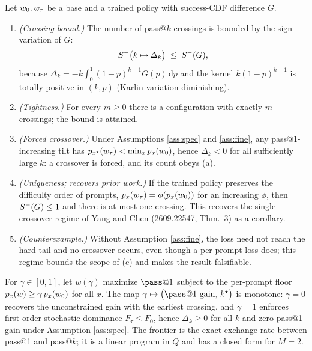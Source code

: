 \begin{theorem}
\label{thm:price}
Let $w_0,w_\tau$ be a base and a trained policy with success-CDF difference $G$.
\begin{enumerate}
\item[(a)] \emph{(Crossing bound.)} The number of pass@$k$ crossings is bounded
by the sign variation of $G$:
\begin{equation}
S^{-}\big(k\mapsto\Delta_k\big)\;\le\;S^{-}(G),
\end{equation}
because $\Delta_k=-k\int_0^1 (1-p)^{k-1}G(p)\,\mathrm{d}p$ and the kernel
$k(1-p)^{k-1}$ is totally positive in $(k,p)$ (Karlin variation diminishing).
\item[(b)] \emph{(Tightness.)} For every $m\ge 0$ there is a configuration with
exactly $m$ crossings; the bound is attained.
\item[(c)] \emph{(Forced crossover.)} Under Assumptions \ref{ass:spec} and
\ref{ass:fine}, any pass@1-increasing tilt has $p_{x^\star}(w_\tau)<\min_x p_x(w_0)$,
hence $\Delta_k<0$ for all sufficiently large $k$: a crossover is forced, and its
count obeys (a).
\item[(d)] \emph{(Uniqueness; recovers prior work.)} If the trained policy
preserves the difficulty order of prompts, $p_x(w_\tau)=\phi(p_x(w_0))$ for an
increasing $\phi$, then $S^{-}(G)\le 1$ and there is at most one crossing. This
recovers the single-crossover regime of Yang and Chen (2609.22547, Thm.~3) as a
corollary.
\item[(e)] \emph{(Counterexample.)} Without Assumption \ref{ass:fine}, the loss
need not reach the hard tail and no crossover occurs, even though a per-prompt
loss does; this regime bounds the scope of (c) and makes the result
falsifiable.
\end{enumerate}
\end{theorem}

\begin{theorem}
\label{thm:frontier}
For $\gamma\in[0,1]$, let $w(\gamma)$ maximize $\pass@1$ subject to the
per-prompt floor $p_x(w)\ge\gamma\,p_x(w_0)$ for all $x$. The map
$\gamma\mapsto\big(\pass@1\text{ gain},\,k^\star\big)$ is monotone: $\gamma=0$
recovers the unconstrained gain with the earliest crossing, and $\gamma=1$
enforces first-order stochastic dominance $F_\tau\le F_0$, hence $\Delta_k\ge0$
for all $k$ and zero pass@1 gain under Assumption \ref{ass:spec}. The frontier
is the exact exchange rate between pass@1 and pass@$k$; it is a linear program
in $Q$ and has a closed form for $M=2$.
\end{theorem}

